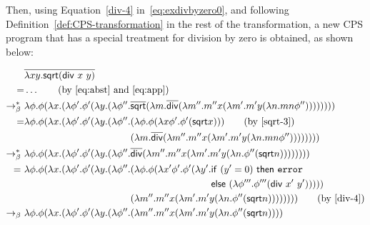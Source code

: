 Then, using Equation~\eqref{div-4} in~\eqref{eq:exdivbyzero0}, and following Definition~\ref{def:CPS-transformation} in the rest of the transformation, a new CPS program that has a special treatment for division by zero is obtained, as shown below: 
%
\begin{example}
\begin{align}
& \overline{\lambda xy. \mathsf{sqrt} (\mathsf{div} \ x \ y)}  \notag \\
 = & \dots  \tag{by~\eqref{eq:abst} and~\eqref{eq:app}} \\
 \bred \ &  \lambda \phi. \phi ( \lambda x. ( \lambda \phi'. \phi' ( \lambda y. ( \lambda \phi''. \overline{\mathsf{sqrt}}(\lambda m. \overline{\mathsf{div}}  (\lambda m''. m'' x ( \lambda m'. m' y (\lambda n. mn \phi ''))) ) )) ) )\notag\\
= &  \lambda \phi. \phi ( \lambda x. ( \lambda \phi'. \phi' ( \lambda y. ( \lambda \phi''. ( \lambda \phi . \phi ( \lambda x \phi'  . \phi'(  \mathsf{sqrt}  x)) ) \tag{by~\eqref{sqrt-3}} \\
& \phantom{ \lambda \phi. \phi ( \lambda x. ( \lambda \phi'. \phi' ( \lambda y. ( \lambda \phi''. } (\lambda m. \overline{\mathsf{div}}  (\lambda m''. m'' x ( \lambda m'. m' y (\lambda n. mn \phi ''))) ) )) ) ) \notag \\
\bred \ &   \lambda \phi. \phi ( \lambda x. ( \lambda \phi'. \phi' ( \lambda y. ( \lambda \phi''.  \overline{\mathsf{div}}  (\lambda m''. m'' x ( \lambda m'. m' y (\lambda n.  \phi''(  \mathsf{sqrt}  n)))) ) ))  ) \notag \\
= \ & \lambda \phi. \phi ( \lambda x. ( \lambda \phi'. \phi' ( \lambda y. ( \lambda \phi''.  (\lambda \phi . \phi ( \lambda x' \phi'. \phi' ( \lambda y'.  \mathsf{if} \ (y' =0)  \ \mathsf{then} \ \mathtt{error}  \notag  \\
& \phantom{ \lambda \phi. \phi ( \lambda x. ( \lambda \phi'. \phi' ( \lambda y. ( \lambda \phi''.  (\lambda \phi . \phi ( \lambda x' \phi'. \phi' ( \lambda y'.} 
\mathsf{else}  \  (\lambda \phi'''. \phi''' (\mathsf{div} \ x' \ y') )) ) ) \notag \\
& \phantom{\lambda \phi. \phi ( \lambda x. ( \lambda \phi'. \phi' ( \lambda y. ( \lambda \phi''.}
(\lambda m''. m'' x ( \lambda m'. m' y (\lambda n.  \phi''(  \mathsf{sqrt}  n)))) ) ))  )  \tag{by~\eqref{div-4}} \\
\bconv \ & \lambda \phi. \phi ( \lambda x. ( \lambda \phi'. \phi' ( \lambda y. ( \lambda \phi''. (\lambda m''. m'' x ( \lambda m'. m' y (\lambda n.  \phi''(  \mathsf{sqrt}  n)))) \notag \\

\end{align}
\end{example}
